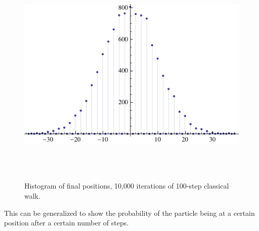\documentclass[a0,portrait]{a0poster}
\begin{document}
\begin{center}
{\begin{figure}
\includegraphics[height=110mm]{classic-10k-of-100-itterations.pdf}
\caption{Histogram of final positions, 10,000 iterations of 100-step classical walk.}
\label{clas_10k}
\end{figure}    

This can be generalized to show the probability of the particle being at a certain position after a certain number of steps\cite{Ke:2003}.

}
\end{center}
\end{document}
